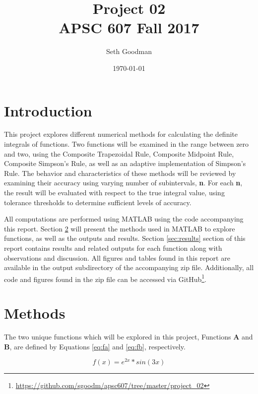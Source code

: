 \documentclass[a4paper]{article}
\title{
	Project 02 \\
	\bigskip
	\normalsize APSC 607 Fall 2017
}
\author{Seth Goodman}
\date{\today}
\begin{document}
\maketitle



\section{Introduction}
\label{sec:introduction}

This project explores different numerical methods for calculating the definite integrals of functions. Two functions will be examined in the range between zero and two, using the Composite Trapezoidal Rule, Composite Midpoint Rule, Composite Simpson’s Rule, as well as an adaptive implementation of Simpson’s Rule. The behavior and characteristics of these methods will be reviewed by examining their accuracy using varying number of subintervals, \textbf{n}. For each \textbf{n}, the result will be evaluated with respect to the true integral value, using tolerance thresholds to determine sufficient levels of accuracy. 

All computations are performed using MATLAB using the code accompanying this report. Section \ref{sec:methods} will present the methods used in MATLAB to explore functions, as well as the outputs and results. Section \ref{sec:results} section of this report contains results and related outputs for each function along with observations and discussion. All figures and tables found in this report are available in the output subdirectory of the accompanying zip file. Additionally, all code and figures found in the zip file can be accessed via GitHub\footnote{\url{https://github.com/sgoodm/apsc607/tree/master/project_02}}.



\newpage
\section{Methods}
\label{sec:methods}

The two unique functions which will be explored in this project, Functions \textbf{A} and \textbf{B}, are defined by Equations \ref{eq:fa} and \ref{eq:fb}, respectively. 

\begin{equation}
f(x) = e^{2x} * sin(3x)
\label{eq:fa}
\end{equation}
\end{document}

